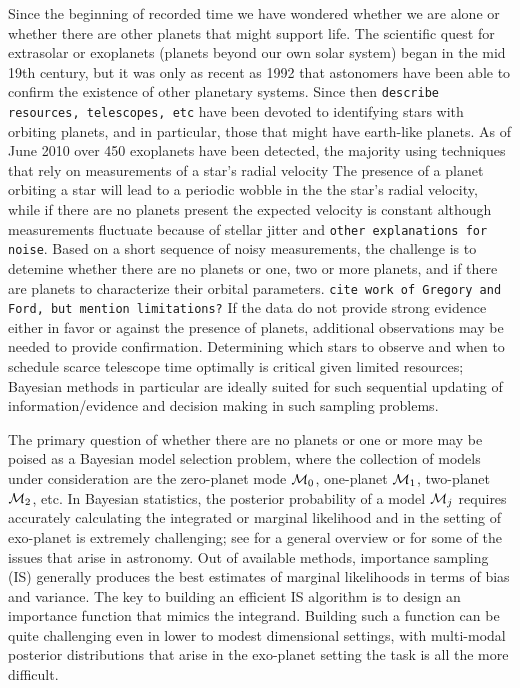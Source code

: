 \documentclass[aoas]{imsart}
\def\M{{\cal{M}}}
\begin{document}
Since the beginning of recorded time we have wondered whether we are
alone or whether there are other planets that might support life. The
scientific quest for extrasolar or exoplanets (planets beyond our own
solar system) began in the mid 19th century, but it was only as recent
as 1992 that astonomers have been able to confirm the existence of
other planetary systems.  Since then {\tt describe resources,
  telescopes, etc} have been devoted to identifying stars with
orbiting planets, and in particular, those that might have earth-like
planets. As of June 2010 over 450 exoplanets have been detected, the
majority using techniques that rely on measurements of a star's radial
velocity The presence of a planet orbiting a star will lead to a
periodic wobble in the the star's radial velocity, while if there are
no planets present the expected velocity is constant although
measurements fluctuate because of stellar jitter and {\tt other
  explanations for noise}.  Based on a short sequence of noisy
measurements, the challenge is to detemine whether there are no
planets or one, two or more planets, and if there are planets to
characterize their orbital parameters.  {\tt cite work of Gregory and
  Ford, but mention limitations?}  If the data do not provide strong
evidence either in favor or against the presence of planets,
additional observations may be needed to provide confirmation.
Determining which stars to observe and when to schedule scarce
telescope time optimally is critical given limited resources; Bayesian methods in particular
are ideally suited for such sequential updating of
information/evidence and decision making in such sampling problems.


The primary question of whether there are no planets or one or more
may be poised as a Bayesian model selection problem, where the
collection of models under consideration are the zero-planet mode
$\M_0$, one-planet $\M_1$, two-planet $\M_2$, etc.  In Bayesian
statistics, the posterior probability of a model $\M_j$ requires
accurately calculating the integrated or marginal likelihood and in
the setting of exo-planet is extremely challenging; see
\citet{Clyd:Geor:2004} for a general overview or \cite{Clyd:etal:2005}
for some of the issues that arise in astronomy. Out of available
methods, importance sampling (IS) generally produces the best
estimates of marginal likelihoods in terms of bias and variance. The
key to building an efficient IS algorithm is to design an importance
function that mimics the integrand.  Building such a function can be
quite challenging even in lower to modest dimensional settings, with
multi-modal posterior distributions that arise in the exo-planet
setting the task is all the more difficult. 
\end{document}
